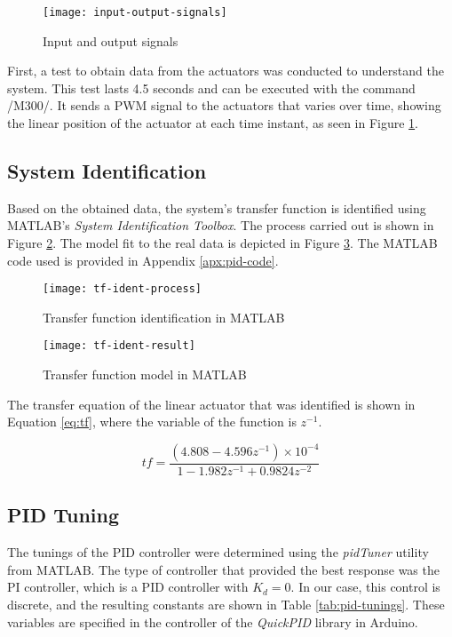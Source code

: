 \begin{figure}[h]
    \centering
    \texttt{[image: input-output-signals]}
    \caption{Input and output signals}
    \label{fig:io-signals}
\end{figure}

First, a test to obtain data from the actuators was conducted to understand the system. This test lasts 4.5 seconds and can be executed with the command \gcodeinline/M300/. It sends a PWM signal to the actuators that varies over time, showing the linear position of the actuator at each time instant, as seen in Figure \ref{fig:io-signals}.


\subsection{System Identification}

Based on the obtained data, the system's transfer function is identified using MATLAB's \textit{System Identification Toolbox}. The process carried out is shown in Figure \ref{fig:tf-indent-process}. The model fit to the real data is depicted in Figure \ref{fig:tf-result}. The MATLAB code used is provided in Appendix \ref{apx:pid-code}.

\begin{figure}[H]
    \centering
    \texttt{[image: tf-ident-process]}
    \caption{Transfer function identification in MATLAB}
    \label{fig:tf-indent-process}
\end{figure}

\begin{figure}[H]
    \centering
    \texttt{[image: tf-ident-result]}
    \caption{Transfer function model in MATLAB}
    \label{fig:tf-result}
\end{figure}

The transfer equation of the linear actuator that was identified is shown in Equation \ref{eq:tf}, where the variable of the function is \( z^{-1} \).

\begin{equation}
    \label{eq:tf}
    tf=\frac{(4.808-4.596z^{-1})\times10^{-4}}{1-1.982z^{-1}+0.9824z^{-2}}
\end{equation}


\subsection{PID Tuning}

The tunings of the PID controller were determined using the \textit{pidTuner} utility from MATLAB. The type of controller that provided the best response was the PI controller, which is a PID controller with \( K_d = 0 \). In our case, this control is discrete, and the resulting constants are shown in Table \ref{tab:pid-tunings}. These variables are specified in the controller of the \textit{QuickPID} library in Arduino.

